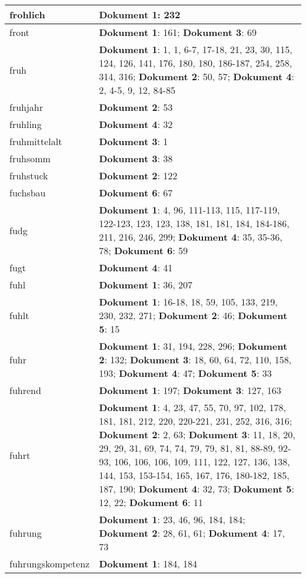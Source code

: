 \documentclass[a5paper]{article}
\begin{document}
\begin{longtable}[l]{|l|p{3in}|}
\hline
frohlich & \textbf{Dokument 1}: 232 \\
\hline
front & \textbf{Dokument 1}: 161; \textbf{Dokument 3}: 69 \\
\hline
fruh & \textbf{Dokument 1}: 1, 1, 6-7, 17-18, 21, 23, 30, 115, 124, 126, 141, 176, 180, 180, 186-187, 254, 258, 314, 316; \textbf{Dokument 2}: 50, 57; \textbf{Dokument 4}: 2, 4-5, 9, 12, 84-85 \\
\hline
fruhjahr & \textbf{Dokument 2}: 53 \\
\hline
fruhling & \textbf{Dokument 4}: 32 \\
\hline
fruhmittelalt & \textbf{Dokument 3}: 1 \\
\hline
fruhsomm & \textbf{Dokument 3}: 38 \\
\hline
fruhstuck & \textbf{Dokument 2}: 122 \\
\hline
fuchsbau & \textbf{Dokument 6}: 67 \\
\hline
fudg & \textbf{Dokument 1}: 4, 96, 111-113, 115, 117-119, 122-123, 123, 123, 138, 181, 181, 184, 184-186, 211, 216, 246, 299; \textbf{Dokument 4}: 35, 35-36, 78; \textbf{Dokument 6}: 59 \\
\hline
fugt & \textbf{Dokument 4}: 41 \\
\hline
fuhl & \textbf{Dokument 1}: 36, 207 \\
\hline
fuhlt & \textbf{Dokument 1}: 16-18, 18, 59, 105, 133, 219, 230, 232, 271; \textbf{Dokument 2}: 46; \textbf{Dokument 5}: 15 \\
\hline
fuhr & \textbf{Dokument 1}: 31, 194, 228, 296; \textbf{Dokument 2}: 132; \textbf{Dokument 3}: 18, 60, 64, 72, 110, 158, 193; \textbf{Dokument 4}: 47; \textbf{Dokument 5}: 33 \\
\hline
fuhrend & \textbf{Dokument 1}: 197; \textbf{Dokument 3}: 127, 163 \\
\hline
fuhrt & \textbf{Dokument 1}: 4, 23, 47, 55, 70, 97, 102, 178, 181, 181, 212, 220, 220-221, 231, 252, 316, 316; \textbf{Dokument 2}: 2, 63; \textbf{Dokument 3}: 11, 18, 20, 29, 29, 31, 69, 74, 74, 79, 79, 81, 81, 88-89, 92-93, 106, 106, 106, 109, 111, 122, 127, 136, 138, 144, 153, 153-154, 165, 167, 176, 180-182, 185, 187, 190; \textbf{Dokument 4}: 32, 73; \textbf{Dokument 5}: 12, 22; \textbf{Dokument 6}: 11 \\
\hline
fuhrung & \textbf{Dokument 1}: 23, 46, 96, 184, 184; \textbf{Dokument 2}: 28, 61, 61; \textbf{Dokument 4}: 17, 73 \\
\hline
fuhrungskompetenz & \textbf{Dokument 1}: 184, 184 \\
\hline

\end{longtable}
\end{document}
